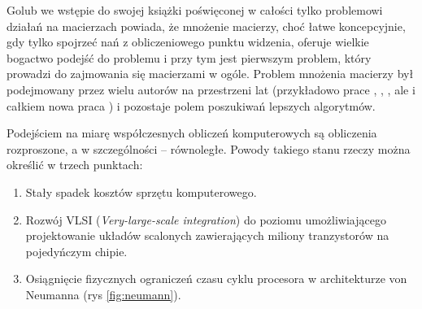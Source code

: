 Golub\cite{Golub} we wstępie do swojej książki poświęconej w całości tylko problemowi działań na macierzach powiada, że mnożenie macierzy, choć łatwe koncepcyjnie, gdy tylko spojrzeć nań z obliczeniowego punktu widzenia, oferuje wielkie bogactwo podejść do problemu i przy tym jest pierwszym problem, który prowadzi do zajmowania się macierzami w ogóle. Problem mnożenia macierzy był podejmowany przez wielu autorów na przestrzeni lat (przykładowo prace \cite{Strassen68}, \cite{Winograd}, \cite{Cannon:1969:CCI:905686}, ale i całkiem nowa praca \cite{DBLP:journals/corr/abs-1202-3173}) i pozostaje polem poszukiwań lepszych algorytmów.

Podejściem na miarę współczesnych obliczeń komputerowych są obliczenia rozproszone, a w szczególności -- równoległe. Powody takiego stanu rzeczy można określić w trzech punktach:
\begin{enumerate}
\item{Stały spadek kosztów sprzętu komputerowego.}
\item{Rozwój VLSI (\emph{Very-large-scale integration}) do poziomu umożliwiającego projektowanie układów scalonych zawierających miliony tranzystorów na pojedyńczym chipie.}
\item{Osiągnięcie fizycznych ograniczeń czasu cyklu procesora w architekturze von Neumanna (rys \ref{fig:neumann}).}
\end{enumerate}

